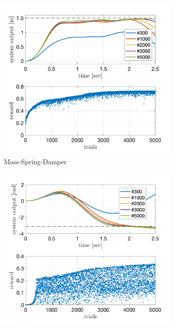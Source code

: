 \documentclass[letterpaper, 10 pt, conference]{ieeeconf}  %
\begin{document}
\begin{figure}[!thp] 
	\centering
	\begin{subfigure}{0.325\textwidth}
	\includegraphics[width=\textwidth]{julia_sdm_quad.png}
	\caption{Mass-Spring-Damper \newline}\label{fig:PoWER_sdm}
	\end{subfigure}
	\begin{subfigure}{0.325\textwidth}
	\includegraphics[width=\textwidth]{julia_pend_quad.png}

\end{subfigure}
\end{figure}
\end{document}
